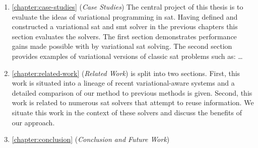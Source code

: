 \begin{enumerate}
  \item \autoref{chapter:case-studies} (\emph{Case Studies}) The central project
    of this thesis is to evaluate the ideas of variational programming in
    \acl{sat}. Having defined and constructed a variational \ac{sat} and
    \ac{smt} solver in the previous chapters this section evaluates the solvers.
    The first section demonstrates performance gains made possible with by
    variational \ac{sat} solving. The
    second section provides examples of variational versions of classic \ac{sat}
    problems such as: \ldots{}

  \item \autoref{chapter:related-work} (\emph{Related Work}) is split into two
    sections. First, this work is situated into a lineage of recent
    variational-aware systems and a detailed comparison of our method to
    previous methods is given. Second, this work is related to numerous \ac{sat}
    solvers that attempt to reuse information. We situate this work in the
    context of these solvers and discuss the benefits of our approach.


  \item \autoref{chapter:conclusion} (\emph{Conclusion and Future Work})
  \end{enumerate}




